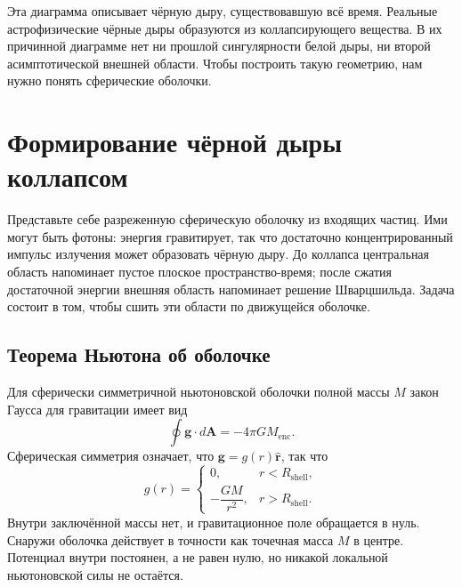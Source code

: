 \begin{classroomqa}
\end{classroomqa}

Эта диаграмма описывает чёрную дыру, существовавшую всё время. Реальные астрофизические чёрные дыры образуются из коллапсирующего вещества. В их причинной диаграмме нет ни прошлой сингулярности белой дыры, ни второй асимптотической внешней области. Чтобы построить такую геометрию, нам нужно понять сферические оболочки.

\section{Формирование чёрной дыры коллапсом}

Представьте себе разреженную сферическую оболочку из входящих частиц. Ими могут быть фотоны: энергия гравитирует, так что достаточно концентрированный импульс излучения может образовать чёрную дыру. До коллапса центральная область напоминает пустое плоское пространство-время; после сжатия достаточной энергии внешняя область напоминает решение Шварцшильда. Задача состоит в том, чтобы сшить эти области по движущейся оболочке.

\subsection{Теорема Ньютона об оболочке}

Для сферически симметричной ньютоновской оболочки полной массы \(M\) закон Гаусса для гравитации имеет вид
\begin{equation}
\oint \mathbf{g}\cdot d\mathbf{A}=-4\pi G M_{\mathrm{enc}}.
\label{eq:l04-gauss-gravity}
\end{equation}
Сферическая симметрия означает, что \(\mathbf{g}=g(r)\hat{\mathbf r}\), так что
\begin{equation}
g(r)=
\begin{cases}
0, & r<R_{\mathrm{shell}},\\[4pt]
-\dfrac{GM}{r^2}, & r>R_{\mathrm{shell}}.
\end{cases}
\label{eq:l04-shell-field}
\end{equation}
Внутри заключённой массы нет, и гравитационное поле обращается в нуль. Снаружи оболочка действует в точности как точечная масса \(M\) в центре. Потенциал внутри постоянен, а не равен нулю, но никакой локальной ньютоновской силы не остаётся.

